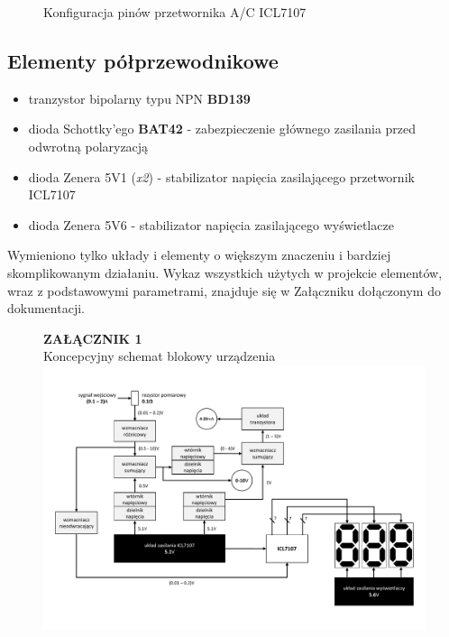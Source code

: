 \documentclass[12pt]{article}
\begin{document}
\begin{itemize}
\begin{figure}[h]
	\label{icl7107_pinout}
	\caption{Konfiguracja pinów przetwornika A/C ICL7107}
	\end{figure}
\end{itemize}
\subsection{Elementy półprzewodnikowe}
\begin{itemize}
	\item tranzystor bipolarny typu NPN \textbf{BD139}
	\item dioda Schottky'ego \textbf{BAT42} - zabezpieczenie głównego zasilania przed odwrotną polaryzacją
	\item dioda Zenera 5V1 (\textit{x2}) - stabilizator napięcia zasilającego przetwornik ICL7107
	\item dioda Zenera 5V6 - stabilizator napięcia zasilającego wyświetlacze
\end{itemize}
Wymieniono tylko układy i elementy o większym znaczeniu i bardziej skomplikowanym działaniu. Wykaz wszystkich użytych w projekcie elementów, wraz z podstawowymi parametrami, znajduje się w Załączniku dołączonym do dokumentacji.


\begin{figure}
	\centering
	\LARGE \textbf{ZAŁĄCZNIK 1} \\
	\large Koncepcyjny schemat blokowy urządzenia \\
	\includegraphics[scale=0.90, origin=c]{diagram_blokowy.png}
\end{figure}
	
\end{document}
